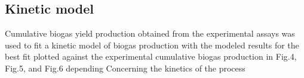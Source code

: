 \subsection{Kinetic model}
Cumulative biogas yield production obtained from the experimental assays was used to fit a kinetic model of biogas production with the modeled results for the best fit plotted against the experimental cumulative biogas production in Fig.4, Fig.5, and Fig.6 depending 
Concerning the kinetics of the process